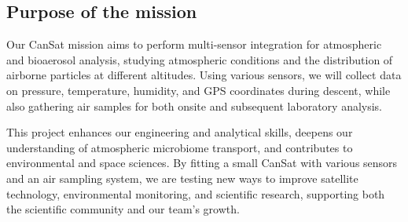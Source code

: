 \subsection{Purpose of the mission}

Our CanSat mission aims to perform multi-sensor integration for atmospheric and bioaerosol analysis, studying atmospheric conditions and the distribution of airborne particles at different altitudes. Using various sensors, we will collect data on pressure, temperature, humidity, and GPS coordinates during descent, while also gathering air samples for both onsite and subsequent laboratory analysis.

This project enhances our engineering and analytical skills, deepens our understanding of atmospheric microbiome transport, and contributes to environmental and space sciences. By fitting a small CanSat with various sensors and an air sampling system, we are testing new ways to improve satellite technology, environmental monitoring, and scientific research, supporting both the scientific community and our team's growth.